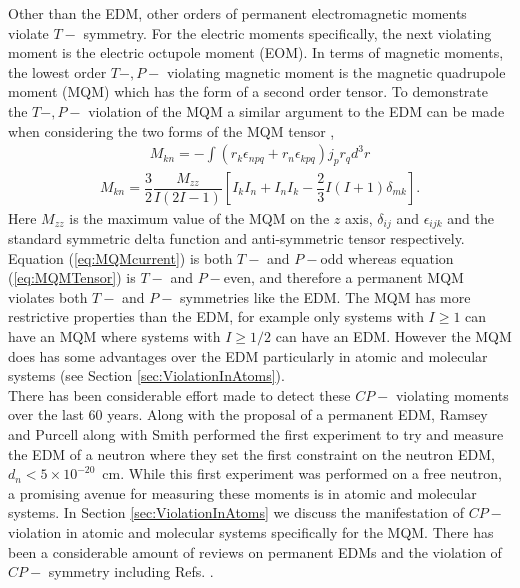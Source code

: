 \documentclass[10pt,a4paper, twoside, openright]{report}
\begin{document}
\linebreak
Other than the EDM, other orders of permanent electromagnetic moments violate $T-$ symmetry. For the electric moments specifically, the next violating moment is the electric octupole moment (EOM). In terms of magnetic moments, the lowest order $T-,P-$ violating magnetic moment is the magnetic quadrupole moment (MQM) which has the form of a second order tensor. To demonstrate the $T-,P-$ violation of the MQM a similar argument to the EDM can be made when considering the two forms of the MQM tensor \cite{SFK1984},
\begin{align} \label{eq:MQMcurrent}
M_{kn} = - \int \left( r_k \epsilon_{npq} + r_n\epsilon_{kpq} \right)j_pr_q d^3r
\end{align}
\begin{align} \label{eq:MQMTensor}
M_{kn} = \dfrac{3}{2}\dfrac{M_{zz}}{I(2I-1)}\left[I_{k}I_{n} + I_{n}I_{k} - \dfrac{2}{3}I(I+1)\delta_{mk}\right].
\end{align}
Here $M_{zz}$ is the maximum value of the MQM on the $z$ axis, $\delta_{ij}$ and $\epsilon_{ijk}$ and the standard symmetric delta function and anti-symmetric tensor respectively. Equation (\ref{eq:MQMcurrent}) is both $T-$ and $P-$odd whereas equation (\ref{eq:MQMTensor}) is $T-$ and $P-$even, and therefore a permanent MQM violates both $T-$ and $P-$ symmetries like the EDM. The MQM has more restrictive properties than the EDM, for example only systems with $I\geq 1$ can have an MQM where systems with $I\geq 1/2$ can have an EDM. However the MQM does has some advantages over the EDM particularly in atomic and molecular systems (see Section \ref{sec:ViolationInAtoms}).\\
\linebreak
There has been considerable effort made to detect these $CP-$ violating moments over the last 60 years. Along with the proposal of a permanent EDM, Ramsey and Purcell along with Smith performed the first experiment to try and measure the EDM of a neutron \cite{Smith1957} where they set the first constraint on the neutron EDM, $d_n < 5 \times 10^{-20}$~cm. While this first experiment was performed on a free neutron, a promising avenue for measuring these moments is in atomic and molecular systems. In Section \ref{sec:ViolationInAtoms} we discuss the manifestation of $CP-$ violation in atomic and molecular systems specifically for the MQM. There has been a considerable amount of reviews on permanent EDMs and the violation of $CP-$ symmetry including Refs. \cite{Barr1993, KhriplovichCP, GingesReview, Pospelov2005, LeptonMoments, Fukuyama2012, Engel2013, Jungmann2013, Roberts2015, Yamanaka2017, Safronova2018, Chupp2019}.
\end{document}

